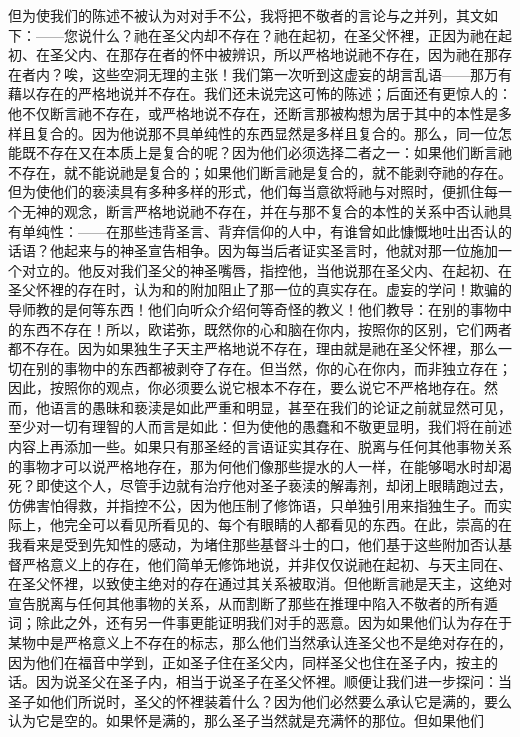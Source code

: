 但为使我们的陈述不被认为对对手不公，我将把不敬者的言论与之并列，其文如下：——\newline{}您说什么？祂在圣父内却不存在？祂在起初，在圣父怀裡，正因为祂在起初、在圣父内、在那存在者的怀中被辨识，所以严格地说祂不存在，因为祂在那存在者内？唉，这些空洞无理的主张！我们第一次听到这虚妄的胡言乱语——那万有藉以存在的严格地说并不存在。我们还未说完这可怖的陈述；后面还有更惊人的：他不仅断言祂不存在，或严格地说不存在，还断言那被构想为居于其中的本性是多样且复合的。因为他说那不具单纯性的东西显然是多样且复合的。那么，同一位怎能既不存在又在本质上是复合的呢？因为他们必须选择二者之一：如果他们断言祂不存在，就不能说祂是复合的；如果他们断言祂是复合的，就不能剥夺祂的存在。但为使他们的亵渎具有多种多样的形式，他们每当意欲将祂与对照时，便抓住每一个无神的观念，断言严格地说祂不存在，并在与那不复合的本性的关系中否认祂具有单纯性：——在那些违背圣言、背弃信仰的人中，有谁曾如此慷慨地吐出否认的话语？他起来与的神圣宣告相争。因为每当后者证实圣言时，他就对那一位施加一个对立的。他反对我们圣父的神圣嘴唇，指控他，当他说那在圣父内、在起初、在圣父怀裡的存在时，认为和的附加阻止了那一位的真实存在。虚妄的学问！欺骗的导师教的是何等东西！他们向听众介绍何等奇怪的教义！他们教导：在别的事物中的东西不存在！所以，欧诺弥，既然你的心和脑在你内，按照你的区别，它们两者都不存在。因为如果独生子天主严格地说不存在，理由就是祂在圣父怀裡，那么一切在别的事物中的东西都被剥夺了存在。但当然，你的心在你内，而非独立存在；因此，按照你的观点，你必须要么说它根本不存在，要么说它不严格地存在。然而，他语言的愚昧和亵渎是如此严重和明显，甚至在我们的论证之前就显然可见，至少对一切有理智的人而言是如此：但为使他的愚蠢和不敬更显明，我们将在前述内容上再添加一些。如果只有那圣经的言语证实其存在、脱离与任何其他事物关系的事物才可以说严格地存在，那为何他们像那些提水的人一样，在能够喝水时却渴死？即使这个人，尽管手边就有治疗他对圣子亵渎的解毒剂，却闭上眼睛跑过去，仿佛害怕得救，并指控不公，因为他压制了修饰语，只单独引用来指独生子。而实际上，他完全可以看见所看见的、每个有眼睛的人都看见的东西。在此，崇高的在我看来是受到先知性的感动，为堵住那些基督斗士的口，他们基于这些附加否认基督严格意义上的存在，他们简单无修饰地说，并非仅仅说祂在起初、与天主同在、在圣父怀裡，以致使主绝对的存在通过其关系被取消。但他断言祂是天主，这绝对宣告脱离与任何其他事物的关系，从而割断了那些在推理中陷入不敬者的所有遁词；除此之外，还有另一件事更能证明我们对手的恶意。因为如果他们认为存在于某物中是严格意义上不存在的标志，那么他们当然承认连圣父也不是绝对存在的，因为他们在福音中学到，正如圣子住在圣父内，同样圣父也住在圣子内，按主的话。因为说圣父在圣子内，相当于说圣子在圣父怀裡。顺便让我们进一步探问：当圣子如他们所说时，圣父的怀裡装着什么？因为他们必然要么承认它是满的，要么认为它是空的。如果怀是满的，那么圣子当然就是充满怀的那位。但如果他们